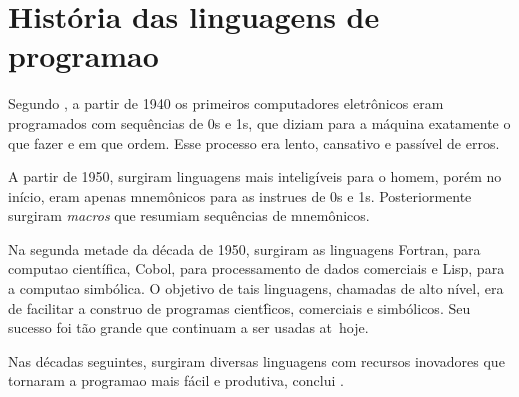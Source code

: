 
\section{Hist\'oria das linguagens de programa\ca o}
\label{revisao:historia}

Segundo \cite{Aho08}, a partir de 1940 os primeiros computadores eletr\^onicos eram programados com sequ\^encias de 0s e 1s, que diziam para a m\'aquina exatamente o que fazer e em que ordem. Esse processo era lento, cansativo e pass\'ivel de erros.

A partir de 1950, surgiram linguagens mais intelig\'iveis para o homem, por\'em no in\'icio, eram apenas mnem\^onicos para as instru\co es de 0s e 1s. Posteriormente surgiram \emph{macros} que resumiam sequ\^encias de mnem\^onicos.

Na segunda metade da d\'ecada de 1950, surgiram as linguagens Fortran, para computa\ca o cient\'ifica, Cobol, para processamento de dados comerciais e Lisp, para a computa\ca o simb\'olica. O objetivo de tais linguagens, chamadas de alto n\'ivel, era de facilitar a constru\ca o de programas cient\'ficos, comerciais e simb\'olicos. Seu sucesso foi t\~ao grande que continuam a ser usadas at\eh\ hoje.

Nas d\'ecadas seguintes, surgiram diversas linguagens com recursos inovadores que tornaram a programa\ca o mais f\'acil e produtiva, conclui \cite{Aho08}.
